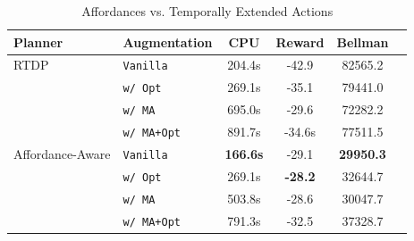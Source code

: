\documentclass[conference]{IEEEtran}
\newcommand{\ra}[1]{\renewcommand{\arraystretch}{#1}} %
\begin{document}



\begin{table}[H]
\centering
\caption{Affordances vs. Temporally Extended Actions}
\begin{tabular}{ l l  | c c c c}
  Planner & Augmentation 					&	CPU	&	Reward 	& Bellman \\ \hline
RTDP &  \texttt{Vanilla}  			&	204.4s	&	-42.9		&	82565.2		\\
 & \texttt{w/ Opt}  				&	269.1s	&	-35.1		&	79441.0		\\
 &\texttt{w/ MA}  				&	695.0s	&	-29.6		&	72282.2		\\
 &\texttt{w/ MA+Opt}  			&	891.7s	&	-34.6s	&	77511.5		\\ \hline
 Affordance-Aware &\texttt{Vanilla}  	& 	{\bf 166.6s}&	-29.1		&	{\bf 29950.3}		\\
  &\texttt{w/ Opt}  				& 	269.1s	&	{\bf -28.2}	&	32644.7		\\
  &\texttt{w/ MA}  				& 	503.8s	&	-28.6		&	30047.7		\\
  &\texttt{w/ MA+Opt}  			& 	791.3s	&	-32.5		&	37328.7		\\
\end{tabular}
\label{table:temp_ext_act_results}
\end{table}
\end{document}
